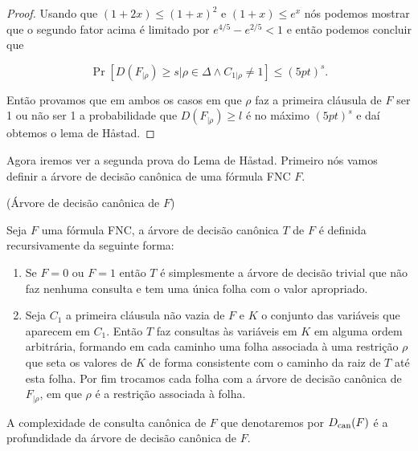 \begin{proof}
Usando que $(1 + 2x) \leq (1 + x)^{2}$ e $(1 + x) \leq e^{x}$ nós podemos mostrar que o segundo fator acima é limitado por $e^{4/5} - e^{2/5} < 1$ e então podemos concluir que

\begin{equation*}
	\Pr[D(F_{\lvert \rho}) \geq s \lvert \rho \in \Delta \land C_{1 \lvert \rho} \neq 1] \leq (5pt)^{s}.
\end{equation*}

Então provamos que em ambos os casos em que $\rho$ faz a primeira cláusula de $F$ ser 1 ou não ser 1 a probabilidade que $D(F_{\lvert \rho}) \geq l$ é no máximo $(5pt)^{s}$ e daí obtemos o lema de  Håstad.

\end{proof}

Agora iremos ver a segunda prova do Lema de Håstad. Primeiro nós vamos definir a árvore de decisão canônica de uma fórmula FNC $F$.

\begin{defi} (Árvore de decisão canônica de $F$) \label{can_tree}

Seja $F$ uma fórmula FNC, a árvore de decisão canônica $T$ de $F$ é definida recursivamente da seguinte forma:

\begin{enumerate}

	\item Se $F = 0$ ou $F = 1$ então $T$ é simplesmente a árvore de decisão trivial que não faz nenhuma consulta e tem uma única folha com o valor apropriado.
	
	\item Seja $C_{1}$ a primeira cláusula não vazia de $F$ e $K$ o conjunto das variáveis que aparecem em $C_{1}$. Então $T$ faz consultas às variáveis em $K$ em alguma ordem arbitrária, formando em cada caminho uma folha associada à uma restrição $\rho$ que seta os valores de $K$ de forma consistente com o caminho da raiz de $T$ até esta folha. Por fim trocamos cada folha com a árvore de decisão canônica de $F_{\lvert \rho}$, em que $\rho$ é a restrição associada à folha.

\end{enumerate}

\end{defi}

\begin{defi} \label{can_depth}

A complexidade de consulta canônica de $F$ que denotaremos por $D_{\text{can}}(F)$ é a profundidade da árvore de decisão canônica de $F$.

\end{defi}

